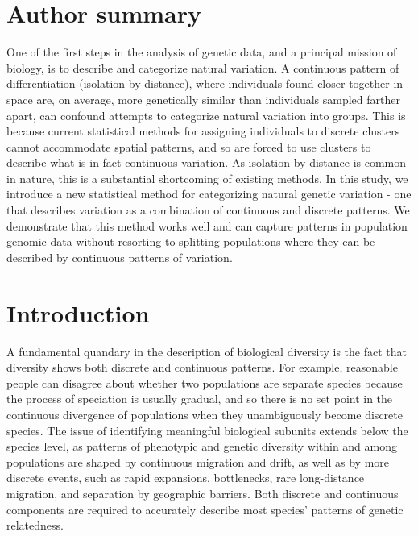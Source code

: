 \documentclass[10pt,letterpaper]{article}
\newif\ifsubmissionversion
\begin{document}
\ifsubmissionversion
\newpage
\fi


\section*{Author summary}
One of the first steps in the analysis of genetic data, 
and a principal mission of biology, 
is to describe and categorize natural variation. 
A continuous pattern of differentiation (isolation by distance), 
where individuals found closer together in space 
are, on average, more genetically similar than individuals sampled farther apart, 
can confound attempts to categorize natural variation into groups.  
This is because current statistical methods for assigning individuals to discrete clusters 
cannot accommodate spatial patterns, 
and so are forced to use clusters to describe what is in fact
continuous variation. 
As isolation by distance is common in nature, 
this is a substantial shortcoming of existing methods.
In this study, we introduce a new statistical method 
for categorizing natural genetic variation - 
one that describes variation as a combination of continuous and discrete patterns.
We demonstrate that this method works well and can capture patterns in
population genomic data without resorting to splitting populations
where they can be described by continuous patterns of variation.

\ifsubmissionversion
\linenumbers
\fi

\newpage
\section*{Introduction}
A fundamental quandary in the description of biological diversity is
the fact that diversity shows both discrete and continuous patterns. 
For example, reasonable people can disagree about whether two 
populations are separate species because the 
process of speciation is usually gradual, and so there is no set point
in the continuous divergence of populations when they unambiguously become discrete species.
The issue of identifying meaningful biological subunits 
extends below the species level, as patterns of phenotypic
and genetic diversity within and among populations are shaped
by continuous migration and drift, as well as by more discrete events, 
such as rapid expansions, bottlenecks, rare long-distance migration,
and separation by geographic barriers.
Both discrete and continuous components
are required to accurately describe most species' patterns of genetic relatedness.
\end{document}
